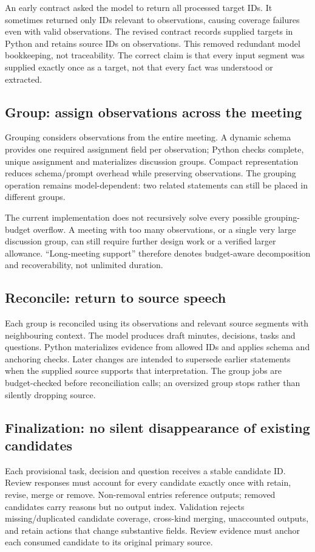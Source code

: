 \documentclass[11pt,a4paper]{article}
\begin{document}
An early contract asked the model to return all processed target IDs. It sometimes returned only IDs relevant to observations, causing coverage failures even with valid observations. The revised contract records supplied targets in Python and retains source IDs on observations. This removed redundant model bookkeeping, not traceability. The correct claim is that every input segment was supplied exactly once as a target, not that every fact was understood or extracted.

\subsection{Group: assign observations across the meeting}
Grouping considers observations from the entire meeting. A dynamic schema provides one required assignment field per observation; Python checks complete, unique assignment and materializes discussion groups. Compact representation reduces schema/prompt overhead while preserving observations. The grouping operation remains model-dependent: two related statements can still be placed in different groups.

The current implementation does not recursively solve every possible grouping-budget overflow. A meeting with too many observations, or a single very large discussion group, can still require further design work or a verified larger allowance. ``Long-meeting support'' therefore denotes budget-aware decomposition and recoverability, not unlimited duration.

\subsection{Reconcile: return to source speech}
Each group is reconciled using its observations and relevant source segments with neighbouring context. The model produces draft minutes, decisions, tasks and questions. Python materializes evidence from allowed IDs and applies schema and anchoring checks. Later changes are intended to supersede earlier statements when the supplied source supports that interpretation. The group jobs are budget-checked before reconciliation calls; an oversized group stops rather than silently dropping source.

\subsection{Finalization: no silent disappearance of existing candidates}
Each provisional task, decision and question receives a stable candidate ID. Review responses must account for every candidate exactly once with retain, revise, merge or remove. Non-removal entries reference outputs; removed candidates carry reasons but no output index. Validation rejects missing/duplicated candidate coverage, cross-kind merging, unaccounted outputs, and retain actions that change substantive fields. Review evidence must anchor each consumed candidate to its original primary source.
\end{document}
